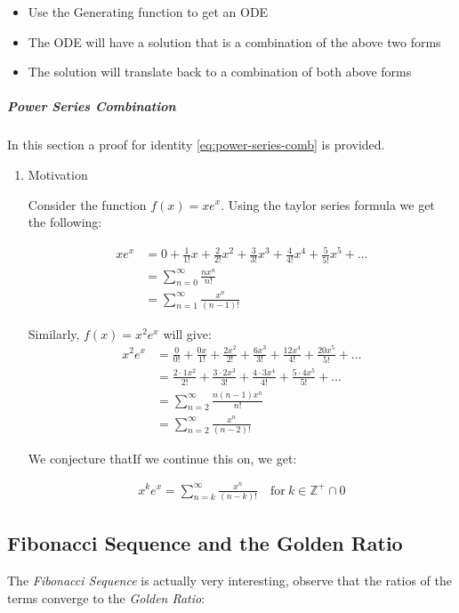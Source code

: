 \documentclass[11pt]{article}
\begin{document}
\begin{itemize}
\item Use the Generating function to get an ODE
\item The ODE will have a solution that is a combination of the above two forms
\item The solution will translate back to a combination of both above forms
\end{itemize}
\subparagraph{Power Series Combination}
\label{power-series-comb}
In this section a proof for identity \ref{eq:power-series-comb} is provided.
\begin{enumerate}
\item Motivation
\label{sec:org8e3c998}

Consider the function \(f(x) = xe^x\). Using the taylor series formula we get the following:

\begin{align*}
    xe^x &= 0+\frac{1}{1!}x+\frac{2}{2!}x^2+\frac{3}{3!}x^3+\frac{4}{4!}x^4+\frac{5}{5!}x^5+\dots\\
    &= \sum_{n=0}^\infty \frac{nx^n}{n!}\\
    &= \sum_{n=1}^\infty \frac{x^n}{(n-1)!}
\end{align*}

Similarly, \(f(x) = x^2e^x\) will give:
\begin{align*}
    x^2e^x &= \frac{0}{0!} + \frac{0x}{1!} + \frac{2x^2}{2!} + \frac{6x^3}{3!} + \frac{12x^4}{4!} + \frac{20x^5}{5!} + \dots\\
    &= \frac{2\cdot 1x^2}{2!} + \frac{3\cdot 2 x^3}{3!} + \frac{4\cdot 3x^4}{4!} + \frac{5\cdot 4 x^5}{5!} + \dots\\
    &= \sum_{n=2}^\infty \frac{n(n-1)x^n}{n!}\\
    &= \sum_{n=2}^\infty \frac{x^n}{(n-2)!}
\end{align*}

We conjecture thatIf we continue this on, we get:

\begin{align*}
    x^ke^x = \sum_{n=k}^\infty \frac{x^n}{(n-k)!} \quad \text{for}~k\in \mathbb{Z^{+}}\cap0
\end{align*}
\end{enumerate}

\subsection{Fibonacci Sequence and the Golden Ratio}
\label{fib-golden-ratio-proof}
The \emph{Fibonacci Sequence} is actually very interesting, observe that the ratios of the terms converge to the \emph{Golden Ratio}:
\end{document}
